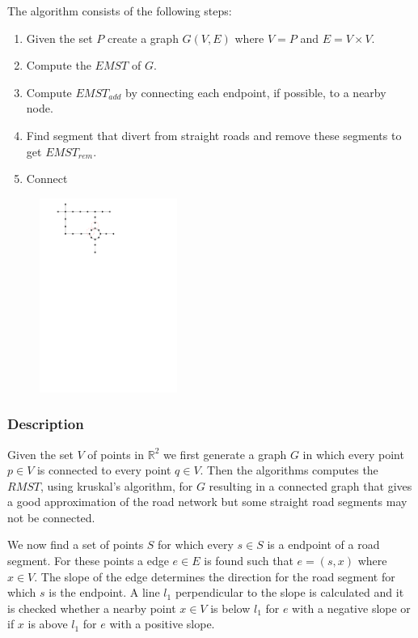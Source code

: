 \documentclass[11pt, twocolumn]{article}
\begin{document}
The algorithm consists of the following steps:
\begin{enumerate}
  \item Given the set $P$ create a graph $G(V,E)$ where $V=P$ and $E=V\times V$.
  \item Compute the $EMST$ of $G$.
  \item Compute $EMST_{add}$ by connecting each endpoint, if possible, to a nearby node.
  \item Find segment that divert from straight roads and remove these segments to get $EMST_{rem}$.
  \item Connect
\end{enumerate}
  \begin{figure}[h]
    \begin{center}
      \graphicspath{ {images/}}
      \includegraphics[width=0.4\textwidth]{NetworkMST}
      \label{fig:}
      \caption{}
    \end{center}
  \end{figure}
\subsubsection{Description}
Given the set $V$ of points in $\mathbb{R}^2$ we first generate a graph $G$ in which every point $p\in V$ is connected to every point $q \in V$. Then the algorithms computes the $RMST$, using kruskal's algorithm, for $G$ resulting in a connected graph that gives a good approximation of the road network but some straight road segments may not be connected.
 
 We now find a set of points $S$ for which every $s \in S$ is a endpoint of a road segment. For these points a edge $e \in E$ is found such that $e=(s,x)$ where $x \in V$. The slope of the edge determines the direction for the road segment for which $s$ is the endpoint. A line $l_1$ perpendicular to the slope is calculated and it is checked whether a nearby point $x \in V$ is below $l_1$ for $e$ with a negative slope or if $x$ is above $l_1$ for $e$ with a positive slope. 
 
\end{document}
